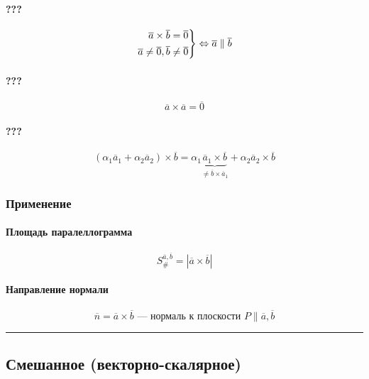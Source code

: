 \documentclass{article}
\newenvironment{rcases}
    {\left.\begin{aligned}}
    {\end{aligned}\right\rbrace}
\begin{document}
\paragraph{???}
\begin{align*} 
    \begin{rcases}
        \overline{a} \times \overline{b} = \overline{0} \\
        \overline{a} \neq \overline{0}, \overline{b} \neq \overline{0}    
    \end{rcases} \Leftrightarrow 
    \overline{a} \parallel \overline{b} 
\end{align*}

\paragraph{???}
\[
    \overline{a} \times \overline{a} = \overline{0}
\]

\paragraph{???}
\[
    \left( \alpha_1 \overline{a}_1 + \alpha_2 \overline{a}_2 \right) \times \overline{b} =
    \alpha_1 \underbrace{\overline{a}_1 \times \overline{b}}_{\neq \overline{b} \times \overline{a}_1} +
    \alpha_2 \overline{a}_2 \times \overline{b}
\]


\subsubsection{Применение}

\paragraph{Площадь паралеллограмма}
\[
    S_{\#}^{\overline{a}, \overline{b}} = \left| \overline{a} \times \overline{b} \right|
\]

\paragraph{Направление нормали}
\[
    \overline{n} = \overline{a} \times \overline{b} \text{ --- нормаль к плоскости } P \parallel \overline{a}, \overline{b}
\]


\par\noindent\rule{\textwidth}{1pt}
\subsection{Смешанное (векторно-скалярное)}
\end{document}
